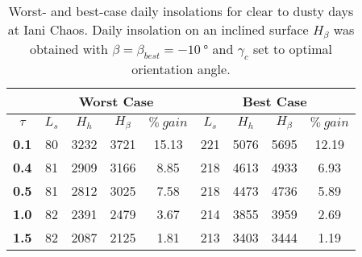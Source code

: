 \begin{table}[h]
\footnotesize
\centering
\caption[Worst- and best-case daily insolations for clear to dusty days at Iani Chaos]
{Worst- and best-case daily insolations for clear to dusty days at Iani Chaos. Daily insolation on an inclined surface $H_{\beta}$ was obtained with $\beta = \beta_{best} = \SI{-10}{\degree}$ and $\gamma_{c}$ set to optimal orientation angle.}
\label{tab:insolation-iani-chaos-clear-and-dusty-days}
\begin{tabular}{c|c|c|c|c|c|c|c|c|}
\cline{2-9}
\multicolumn{1}{l|}{} & \multicolumn{4}{c|}{\textbf{Worst Case}} & \multicolumn{4}{c|}{\textbf{Best Case}} \\ \hline
\multicolumn{1}{|c|}{$\tau$} & $L_{s}$ & $H_{h}$ & $H_{\beta}$ & $\%\:gain$ & $L_{s}$ & $H_{h}$ & $H_{\beta}$ & $\%\:gain$ \\ \hline
\multicolumn{1}{|c|}{\textbf{0.1}} & 80 & 3232 & 3721 & 15.13 & 221 & 5076 & 5695 & 12.19 \\ \hline
\multicolumn{1}{|c|}{\textbf{0.4}} & 81 & 2909 & 3166 & 8.85 & 218 & 4613 & 4933 & 6.93 \\ \hline
\multicolumn{1}{|c|}{\textbf{0.5}} & 81 & 2812 & 3025 & 7.58 & 218 & 4473 & 4736 & 5.89 \\ \hline
\multicolumn{1}{|c|}{\textbf{1.0}} & 82 & 2391 & 2479 & 3.67 & 214 & 3855 & 3959 & 2.69 \\ \hline
\multicolumn{1}{|c|}{\textbf{1.5}} & 82 & 2087 & 2125 & 1.81 & 213 & 3403 & 3444 & 1.19 \\ \hline
\end{tabular}
\end{table}
